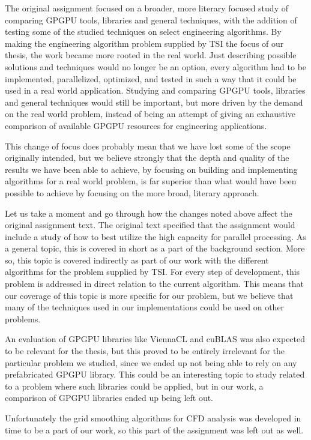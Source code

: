 The original assignment focused on a broader, more literary focused study of comparing GPGPU tools, libraries and general techniques, with the addition of testing some of the studied techniques on select engineering algorithms. By making the engineering algorithm problem supplied by TSI the focus of our thesis, the work became more rooted in the real world. Just describing possible solutions and techniques would no longer be an option, every algorithm had to be implemented, parallelized, optimized, and tested in such a way that it could be used in a real world application. Studying and comparing GPGPU tools, libraries and general techniques would still be important, but more driven by the demand on the real world problem, instead of being an attempt of giving an exhaustive comparison of available GPGPU resources for engineering applications.

This change of focus does probably mean that we have lost some of the scope originally intended, but we believe strongly that the depth and quality of the results we have been able to achieve, by focusing on building and implementing algorithms for a real world problem, is far superior than what would have been possible to achieve by focusing on the more broad, literary approach.

Let us take a moment and go through how the changes noted above affect the original assignment text. The original text specified that the assignment would include a study of how to best utilize the high capacity for parallel processing. As a general topic, this is covered in short as a part of the background section. More so, this topic is covered indirectly as part of our work with the different algorithms for the problem supplied by TSI. For every step of development, this problem is addressed in direct relation to the current algorithm. This means that our coverage of this topic is more specific for our problem, but we believe that many of the techniques used in our implementations could be used on other problems.

An evaluation of GPGPU libraries like ViennaCL and cuBLAS was also expected to be relevant for the thesis, but this proved to be entirely irrelevant for the particular problem we studied, since we ended up not being able to rely on any prefabricated GPGPU library. This could be an interesting topic to study related to a problem where such libraries could be applied, but in our work, a comparison of GPGPU libraries ended up being left out.

Unfortunately the grid smoothing algorithms for CFD analysis was developed in time to be a part of our work, so this part of the assignment was left out as well.
